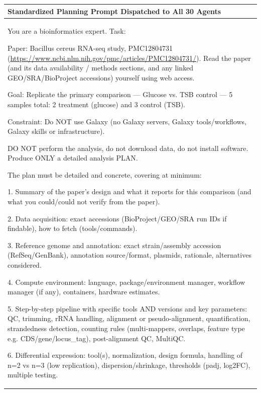 \documentclass[11pt,letterpaper]{article}
\begin{document}
\begin{table}[!htbp]
\centering
\footnotesize
\frenchspacing
\begin{tabularx}{\textwidth}{X}
\toprule
\textbf{Standardized Planning Prompt Dispatched to All 30 Agents} \\
\midrule
You are a bioinformatics expert. Task: \par\vspace{0.4em}
Paper: Bacillus cereus RNA-seq study, PMC12804731 (\url{https://www.ncbi.nlm.nih.gov/pmc/articles/PMC12804731/}). Read the paper (and its data availability / methods sections, and any linked GEO/SRA/BioProject accessions) yourself using web access. \par\vspace{0.4em}
Goal: Replicate the primary comparison --- Glucose vs. TSB control --- 5 samples total: 2 treatment (glucose) and 3 control (TSB). \par
Constraint: Do NOT use Galaxy (no Galaxy servers, Galaxy tools/workflows, Galaxy skills or infrastructure). \par\vspace{0.4em}
DO NOT perform the analysis, do not download data, do not install software. Produce ONLY a detailed analysis PLAN. \par\vspace{0.4em}
The plan must be detailed and concrete, covering at minimum: \par
1. Summary of the paper's design and what it reports for this comparison (and what you could/could not verify from the paper). \par
2. Data acquisition: exact accessions (BioProject/GEO/SRA run IDs if findable), how to fetch (tools/commands). \par
3. Reference genome and annotation: exact strain/assembly accession (RefSeq/GenBank), annotation source/format, plasmids, rationale, alternatives considered. \par
4. Compute environment: language, package/environment manager, workflow manager (if any), containers, hardware estimates. \par
5. Step-by-step pipeline with specific tools AND versions and key parameters: QC, trimming, rRNA handling, alignment or pseudo-alignment, quantification, strandedness detection, counting rules (multi-mappers, overlaps, feature type e.g. CDS/gene/locus\_tag), post-alignment QC, MultiQC. \par
6. Differential expression: tool(s), normalization, design formula, handling of n=2 vs n=3 (low replication), dispersion/shrinkage, thresholds (padj, log2FC), multiple testing. \par

\end{tabularx}
\end{table}
\end{document}
